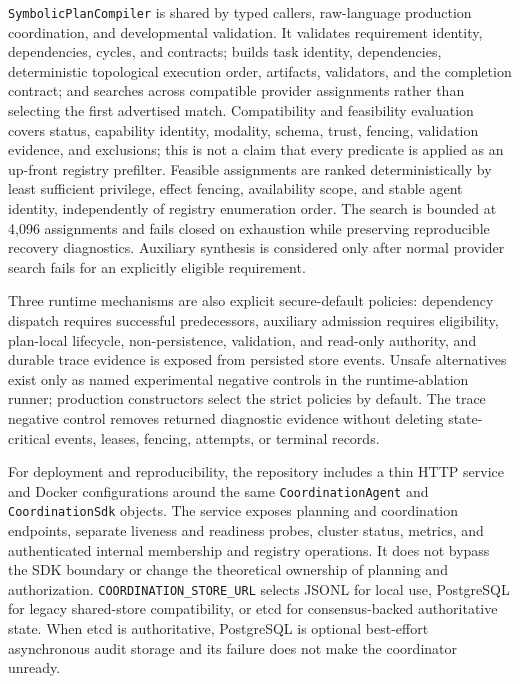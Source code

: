 \texttt{SymbolicPlanCompiler} is shared by typed callers, raw-language production coordination, and developmental validation. It validates requirement identity, dependencies, cycles, and contracts; builds task identity, dependencies, deterministic topological execution order, artifacts, validators, and the completion contract; and searches across compatible provider assignments rather than selecting the first advertised match. Compatibility and feasibility evaluation covers status, capability identity, modality, schema, trust, fencing, validation evidence, and exclusions; this is not a claim that every predicate is applied as an up-front registry prefilter. Feasible assignments are ranked deterministically by least sufficient privilege, effect fencing, availability scope, and stable agent identity, independently of registry enumeration order. The search is bounded at 4,096 assignments and fails closed on exhaustion while preserving reproducible recovery diagnostics. Auxiliary synthesis is considered only after normal provider search fails for an explicitly eligible requirement.

Three runtime mechanisms are also explicit secure-default policies: dependency dispatch requires successful predecessors, auxiliary admission requires eligibility, plan-local lifecycle, non-persistence, validation, and read-only authority, and durable trace evidence is exposed from persisted store events. Unsafe alternatives exist only as named experimental negative controls in the runtime-ablation runner; production constructors select the strict policies by default. The trace negative control removes returned diagnostic evidence without deleting state-critical events, leases, fencing, attempts, or terminal records.

For deployment and reproducibility, the repository includes a thin HTTP service and Docker configurations around the same \texttt{CoordinationAgent} and \texttt{CoordinationSdk} objects. The service exposes planning and coordination endpoints, separate liveness and readiness probes, cluster status, metrics, and authenticated internal membership and registry operations. It does not bypass the SDK boundary or change the theoretical ownership of planning and authorization. \texttt{COORDINATION\_STORE\_URL} selects JSONL for local use, PostgreSQL for legacy shared-store compatibility, or etcd for consensus-backed authoritative state. When etcd is authoritative, PostgreSQL is optional best-effort asynchronous audit storage and its failure does not make the coordinator unready.


